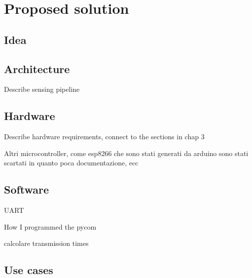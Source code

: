 
\chapter{Proposed solution}\label{chapter:proposed_solution}

\section{Idea}

\section{Architecture}

Describe sensing pipeline 

\section{Hardware}

Describe hardware requirements, connect to the sections in chap 3 

Altri microcontroller, come esp8266 che sono stati generati da arduino sono stati scartati in quanto poca documentazione, ecc

\section{Software}



UART

How I programmed the pycom



calcolare transmission times

\section{Use cases}

